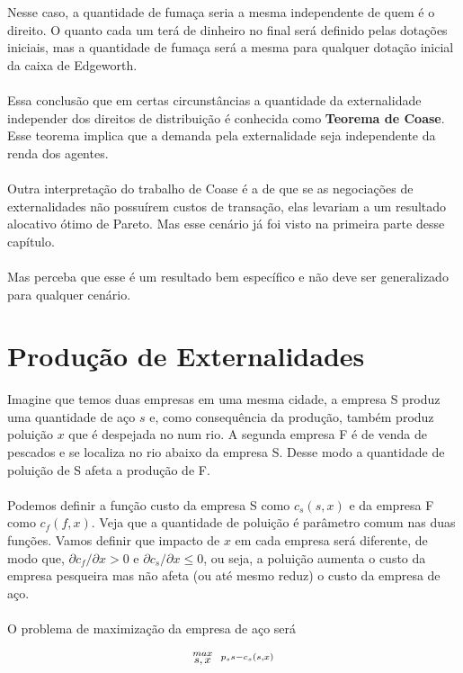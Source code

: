 \documentclass[a4paper,11pt,oneside]{book}
\theoremstyle{definition}
\theoremstyle{break}
\begin{document}
Nesse caso, a quantidade de fumaça seria a mesma independente de quem é o direito. O quanto cada um terá de dinheiro no final será definido pelas dotações iniciais, mas a quantidade de fumaça será a mesma para qualquer dotação inicial da caixa de Edgeworth.
\\
\\
Essa conclusão que em certas circunstâncias a quantidade da externalidade independer dos direitos de distribuição é conhecida como \textbf{Teorema de Coase}. Esse teorema implica que a demanda pela externalidade seja independente da renda dos agentes.
\\
\\
Outra interpretação do trabalho de Coase é a de que se as negociações de externalidades não possuírem custos de transação, elas levariam a um resultado alocativo ótimo de Pareto. Mas esse cenário já foi visto na primeira parte desse capítulo.
\\
\\
Mas perceba que esse é um resultado bem específico e não deve ser generalizado para qualquer cenário.

\section{Produção de Externalidades}

Imagine que temos duas empresas em uma mesma cidade, a empresa S produz uma quantidade de aço $s$ e, como consequência da produção, também produz poluição $x$ que é despejada no num rio. A segunda empresa F é de venda de pescados e se localiza no rio abaixo da empresa S. Desse modo a quantidade de poluição de S afeta a produção de F.
\\
\\
Podemos definir a função custo da empresa S como $c_s(s,x)$ e da empresa F como $c_f(f,x)$. Veja que a quantidade de poluição é parâmetro comum nas duas funções. Vamos definir que impacto de $x$ em cada empresa será diferente, de modo que, $\partial c_f/ \partial x > 0$ e $\partial c_s/ \partial x \leq 0$, ou seja, a poluição aumenta o custo da empresa pesqueira mas não afeta (ou até mesmo reduz) o custo da empresa de aço.
\\
\\
O problema de maximização da empresa de aço será

\begin{center}
	\LARGE $$ \stackrel{max}{\text{\small $s,x$}} \ \ %
	\stackrel{p_s s - c_s(s,x)}{\ } $$ %
\end{center}
\end{document}
